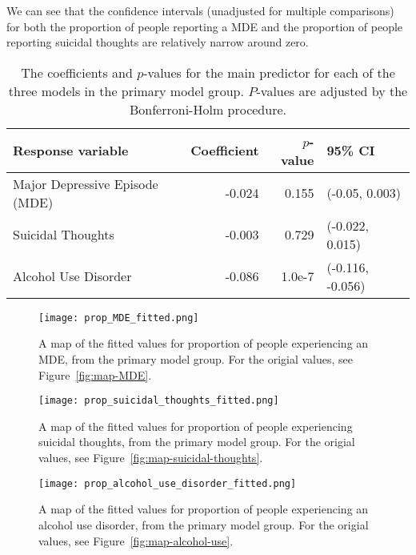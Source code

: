 \documentclass{article}
\begin{document}
We can see that the confidence intervals 
(unadjusted for multiple comparisons) 
for both the proportion of people reporting a MDE
and the proportion of people reporting suicidal thoughts
are relatively narrow around zero.

\begin{table}[t]
\begin{center}
    \begin{tabular}{lrrl}
        \toprule
        Response variable & Coefficient & $p$-value & 95\% CI\\
        \midrule
        Major Depressive Episode (MDE) & -0.024 & 0.155 & (-0.05, 0.003)\\
        Suicidal Thoughts & -0.003 & 0.729 & (-0.022, 0.015)\\
        Alcohol Use Disorder & -0.086 & 1.0e-7 & (-0.116, -0.056)\\
        \bottomrule
    \end{tabular}
\caption{\label{tab:primary-model-results} The coefficients and $p$-values
    for the main predictor for each of the three models
    in the primary model group.
    $P$-values are adjusted by the Bonferroni-Holm procedure.
}
\end{center}
\end{table}

\begin{figure}[!htb]
    \centering
    \texttt{[image: prop\_MDE\_fitted.png]}
    \caption{\label{fig:map-fitted-MDE}
    A map of the fitted values for proportion of people experiencing an
    MDE, from the primary model group. For the origial values, see
    Figure~\ref{fig:map-MDE}.}
\end{figure}

\begin{figure}[!htb]
    \centering
    \texttt{[image: prop\_suicidal\_thoughts\_fitted.png]}
    \caption{\label{fig:map-fitted-suicidal-thoughts}
    A map of the fitted values for proportion of people experiencing
    suicidal thoughts, from the primary model group. For the origial values, see
    Figure~\ref{fig:map-suicidal-thoughts}.}
\end{figure}

\begin{figure}[!htb]
    \centering
    \texttt{[image: prop\_alcohol\_use\_disorder\_fitted.png]}
    \caption{\label{fig:map-fitted-alcohol-use}A map of the fitted values for proportion of people experiencing an
    alcohol use disorder, from the primary model group.
    For the origial values, see Figure~\ref{fig:map-alcohol-use}.}
\end{figure}
\end{document}
